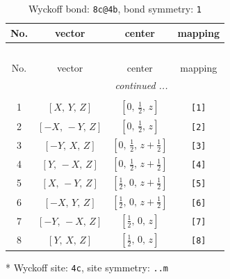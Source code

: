 \documentclass[fleqn,8pt]{jsarticle}
\begin{document}
\renewcommand{\arraystretch}{1.2}
\begin{longtable}{cccc}
\caption{Wyckoff bond: {\tt 8c@4b}, bond symmetry: {\tt 1}}
 \\
 \hline \hline
No. & vector & center & mapping \\ \hline \endfirsthead

\multicolumn{3}{l}{\tablename\ \thetable{}} \\
 \hline \hline
No. & vector & center & mapping \\ \hline \endhead

 \hline \hline
\multicolumn{3}{r}{\footnotesize\it continued ...} \\ \endfoot

 \hline \hline
\multicolumn{3}{r}{} \\ \endlastfoot

1 & $\left[ X,\, Y,\, Z \right]$ & $\left[ 0,\, \frac{1}{2},\, z \right]$ & {\tt [1]} \\ \hline
2 & $\left[ - X,\, - Y,\, Z \right]$ & $\left[ 0,\, \frac{1}{2},\, z \right]$ & {\tt [2]} \\ \hline
3 & $\left[ - Y,\, X,\, Z \right]$ & $\left[ 0,\, \frac{1}{2},\, z + \frac{1}{2} \right]$ & {\tt [3]} \\ \hline
4 & $\left[ Y,\, - X,\, Z \right]$ & $\left[ 0,\, \frac{1}{2},\, z + \frac{1}{2} \right]$ & {\tt [4]} \\ \hline
5 & $\left[ X,\, - Y,\, Z \right]$ & $\left[ \frac{1}{2},\, 0,\, z + \frac{1}{2} \right]$ & {\tt [5]} \\ \hline
6 & $\left[ - X,\, Y,\, Z \right]$ & $\left[ \frac{1}{2},\, 0,\, z + \frac{1}{2} \right]$ & {\tt [6]} \\ \hline
7 & $\left[ - Y,\, - X,\, Z \right]$ & $\left[ \frac{1}{2},\, 0,\, z \right]$ & {\tt [7]} \\ \hline
8 & $\left[ Y,\, X,\, Z \right]$ & $\left[ \frac{1}{2},\, 0,\, z \right]$ & {\tt [8]} \\
\end{longtable}
* Wyckoff site: {\tt 4c}, site symmetry: {\tt ..m}
\renewcommand{\arraystretch}{1.2}
\end{document}
